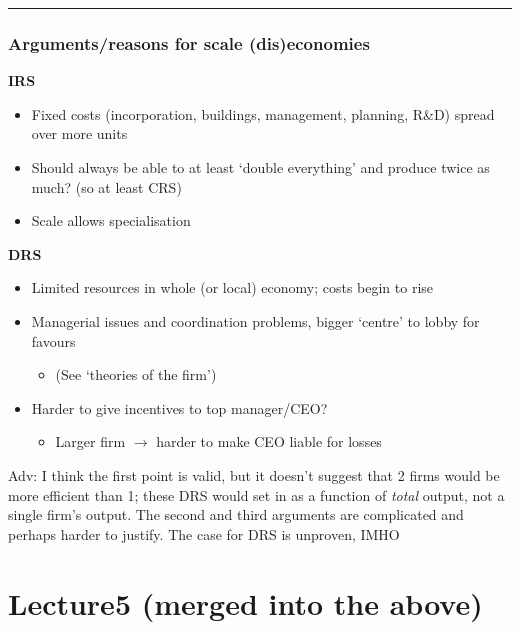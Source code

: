 \documentclass[]{article}
\providecommand{\tightlist}{%
  \setlength{\itemsep}{0pt}\setlength{\parskip}{0pt}}
\begin{document}
\begin{center}\rule{0.5\linewidth}{\linethickness}\end{center}

\hypertarget{IRS-DRS-reasons}{%
\subsubsection{Arguments/reasons for scale
(dis)economies}\label{IRS-DRS-reasons}}

\textbf{IRS}

\begin{itemize}
\tightlist
\item
  Fixed costs (incorporation, buildings, management, planning, R\&D)
  spread over more units
\item
  Should always be able to at least `double everything' and produce
  twice as much? (so at least CRS)
\item
  Scale allows specialisation
\end{itemize}

\textbf{DRS}

\begin{itemize}
\tightlist
\item
  Limited resources in whole (or local) economy; costs begin to rise
\item
  Managerial issues and coordination problems, bigger `centre' to lobby
  for favours

  \begin{itemize}
  \tightlist
  \item
    (See `theories of the firm')
  \end{itemize}
\item
  Harder to give incentives to top manager/CEO?

  \begin{itemize}
  \tightlist
  \item
    Larger firm \(\rightarrow\) harder to make CEO liable for losses
  \end{itemize}
\end{itemize}

Adv: I think the first point is valid, but it doesn't suggest that 2
firms would be more efficient than 1; these DRS would set in as a
function of \emph{total} output, not a single firm's output. The second
and third arguments are complicated and perhaps harder to justify. The
case for DRS is unproven, IMHO

\hypertarget{lecture5-merged-into-the-above}{%
\section{Lecture5 (merged into the
above)}\label{lecture5-merged-into-the-above}}
\end{document}
